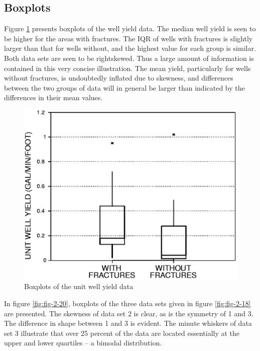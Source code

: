 \documentclass[]{book}
\begin{document}
\hypertarget{boxplots-1}{%
\subsection{Boxplots}\label{boxplots-1}}

Figure \ref{fig:fig-2-19} presents boxplots of the well yield data. The median well yield is seen to be higher for the areas with fractures. The IQR of wells with fractures is slightly larger than that for wells without, and the highest value for each group is similar. Both data sets are seen to be rightskewed. Thus a large amount of information is contained in this very concise illustration. The mean yield, particularly for wells without fractures, is undoubtedly inflated due to skewness, and differences between the two groups of data will in general be larger than indicated by the differences in their mean values.

\begin{figure}

{\centering \includegraphics[width=13.58in]{figures/2_19} 

}

\caption{Boxplots of the unit well yield data}\label{fig:fig-2-19}
\end{figure}

In figure \ref{fig:fig-2-20}, boxplots of the three data sets given in figure \ref{fig:fig-2-18} are presented. The skewness of data set 2 is clear, as is the symmetry of 1 and 3. The difference in shape between 1 and 3 is evident. The minute whiskers of data set 3 illustrate that over 25 percent of the data are located essentially at the upper and lower quartiles -- a bimodal distribution.
\end{document}
